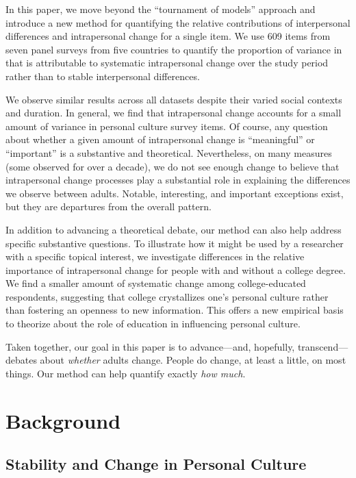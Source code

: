 \documentclass[
  12pt,
]{article}
\begin{document}
In this paper, we move beyond the ``tournament of models'' approach and
introduce a new method for quantifying the relative contributions of
interpersonal differences and intrapersonal change for a single item. We
use 609 items from seven panel surveys from five countries to quantify
the proportion of variance in that is attributable to systematic
intrapersonal change over the study period rather than to stable
interpersonal differences.

We observe similar results across all datasets despite their varied
social contexts and duration. In general, we find that intrapersonal
change accounts for a small amount of variance in personal culture
survey items. Of course, any question about whether a given amount of
intrapersonal change is ``meaningful'' or ``important'' is a substantive
and theoretical. Nevertheless, on many measures (some observed for over
a decade), we do not see enough change to believe that intrapersonal
change processes play a substantial role in explaining the differences
we observe between adults. Notable, interesting, and important
exceptions exist, but they are departures from the overall pattern.

In addition to advancing a theoretical debate, our method can also help
address specific substantive questions. To illustrate how it might be
used by a researcher with a specific topical interest, we investigate
differences in the relative importance of intrapersonal change for
people with and without a college degree. We find a smaller amount of
systematic change among college-educated respondents, suggesting that
college crystallizes one's personal culture rather than fostering an
openness to new information. This offers a new empirical basis to
theorize about the role of education in influencing personal culture.

Taken together, our goal in this paper is to advance---and, hopefully,
transcend---debates about \emph{whether} adults change. People do
change, at least a little, on most things. Our method can help quantify
exactly \emph{how much}.

\hypertarget{background}{%
\section{Background}\label{background}}

\hypertarget{stability-and-change-in-personal-culture}{%
\subsection{Stability and Change in Personal
Culture}\label{stability-and-change-in-personal-culture}}
\end{document}
